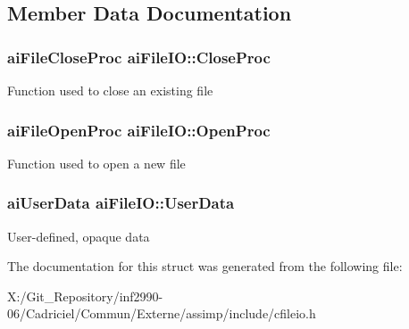 \subsection{Member Data Documentation}
\hypertarget{structai_file_i_o_a7ec702672712b5a02dc49cb17f980a14}{
\subsubsection[{Close\-Proc}]{\setlength{\rightskip}{0pt plus 5cm}ai\-File\-Close\-Proc ai\-File\-I\-O\-::\-Close\-Proc}}\label{structai_file_i_o_a7ec702672712b5a02dc49cb17f980a14}
Function used to close an existing file \hypertarget{structai_file_i_o_a819d9c7823039294125068d06949a6df}{
\subsubsection[{Open\-Proc}]{\setlength{\rightskip}{0pt plus 5cm}ai\-File\-Open\-Proc ai\-File\-I\-O\-::\-Open\-Proc}}\label{structai_file_i_o_a819d9c7823039294125068d06949a6df}
Function used to open a new file \hypertarget{structai_file_i_o_a9c62b7f3d70fbb2f41e33ad0b9933139}{
\subsubsection[{User\-Data}]{\setlength{\rightskip}{0pt plus 5cm}ai\-User\-Data ai\-File\-I\-O\-::\-User\-Data}}\label{structai_file_i_o_a9c62b7f3d70fbb2f41e33ad0b9933139}
User-\/defined, opaque data 

The documentation for this struct was generated from the following file\-:\begin{DoxyCompactItemize}
\item 
X\-:/\-Git\-\_\-\-Repository/inf2990-\/06/\-Cadriciel/\-Commun/\-Externe/assimp/include/cfileio.\-h\end{DoxyCompactItemize}
